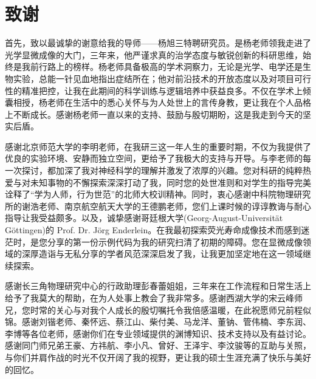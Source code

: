 \chapter[致谢]{致\quad 谢}%

首先，致以最诚挚的谢意给我的导师——杨旭三特聘研究员。是杨老师领我走进了光学显微成像的大门，三年来，他严谨求真的治学态度与敏锐创新的科研思维，始终是我前行路上的榜样。杨老师具备极高的学术洞察力，无论是光学、电学还是生物实验，总能一针见血地指出症结所在；他对前沿技术的开放态度以及对项目可行性的精准把控，让我在此期间的科学训练与逻辑培养中获益良多。不仅在学术上倾囊相授，杨老师在生活中的悉心关怀与为人处世上的言传身教，更让我在个人品格上不断成长。感谢杨老师一直以来的支持、鼓励与殷切期盼，这是我走到今天的坚实后盾。

感谢北京师范大学的李明老师，在我研三这一年人生的重要时期，不仅为我提供了优良的实验环境、安静而独立空间，更给予了我极大的支持与开导。与李老师的每一次探讨，都加深了我对神经科学的理解并激发了浓厚的兴趣。您对科研的纯粹热爱与对未知事物的不懈探索深深打动了我，同时您的处世准则和对学生的指导完美诠释了``学为人师，行为世范''的北师大校训精神。同时，衷心感谢中科院物理研究所的谢浩老师、南京航空航天大学的王德鹏老师，您们上课时候的谆谆教诲与耐心指导让我受益颇多。以及，诚挚感谢哥廷根大学(Georg-August-Universität Göttingen)的 Prof. Dr. Jörg Enderlein。在我最初探索荧光寿命成像技术而感到迷茫时，是您分享的第一份示例代码为我的研究扫清了初期的障碍。您在显微成像领域的深厚造诣与无私分享的学者风范深深启发了我，让我更加坚定地在这一领域继续探索。

感谢长三角物理研究中心的行政助理彭春蕾姐姐，三年来在工作流程和日常生活上给予了我莫大的帮助，在为人处事上教会了我非常多。感谢西湖大学的宋云峰师兄，您时常的关心与对我个人成长的殷切嘱托令我倍感温暖，在此祝愿师兄前程似锦。感谢刘锴老师、秦怀远、蔡江山、柴付美、马龙洋、董钠、管伟楠、李东润、李博等各位老师，感谢你们在专业领域提供的渊博知识、技术支持以及有益讨论。感谢同门师兄弟王豪、方祎航、李小凡、曾好、王泽宇、李汶骏等的互助与关照，与你们并肩作战的时光不仅开阔了我的视野，更让我的硕士生涯充满了快乐与美好的回忆。

